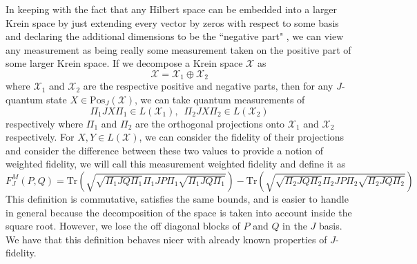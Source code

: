 \documentclass{amsart}
\numberwithin{equation}{section}
\theoremstyle{definition}
\theoremstyle{plain}
\theoremstyle{solutionstyle}
\begin{document}
In keeping with the fact that any Hilbert space can be embedded into a larger Krein space by just extending every vector by zeros with respect to some basis and declaring the additional dimensions to be the  ``negative part" \cite{Bognar1974}, we can view any measurement as being really some measurement taken on the positive part of some larger Krein space. If we decompose a Krein space $\mathcal{X}$ as 
\begin{equation*}\mathcal{X}=\mathcal{X}_1\oplus\mathcal{X}_2\end{equation*} where $\mathcal{X}_1$ and $\mathcal{X}_2$ are the respective positive and negative parts, then for any $J$-quantum state $X\in \mathrm{Pos}_{J}(\mathcal{X})$, we can take quantum measurements of 
\begin{equation*}\Pi_1JX\Pi_1\in L(\mathcal{X}_1),\,\,\,\Pi_2JX\Pi_2\in L(\mathcal{X}_2)\end{equation*}
respectively where $\Pi_1$ and $\Pi_2$ are the orthogonal projections onto $\mathcal{X}_1$ and $\mathcal{X}_2$ respectively. For $X,Y\in L(\mathcal{X})$, we can consider the fidelity of their projections and consider the difference between these two values to provide a notion of weighted fidelity, we will call this measurement weighted fidelity and define it as 
\begin{equation*}F_J^M(P,Q)=\mathrm{Tr}\left(\sqrt{\sqrt{\Pi_1JQ\Pi_1}\Pi_1JP\Pi_1\sqrt{\Pi_1JQ\Pi_1}}\right)-\mathrm{Tr}\left(\sqrt{\sqrt{\Pi_2JQ\Pi_2}\Pi_2JP\Pi_2\sqrt{\Pi_2JQ\Pi_2}}\right)\end{equation*}
This definition is commutative, satisfies the same bounds, and is easier to handle in general because the decomposition of the space is taken into account inside the square root. However, we lose the off diagonal blocks of $P$ and $Q$ in the $J$ basis. We have that this definition behaves nicer with already known properties of $J$-fidelity.
\end{document}
